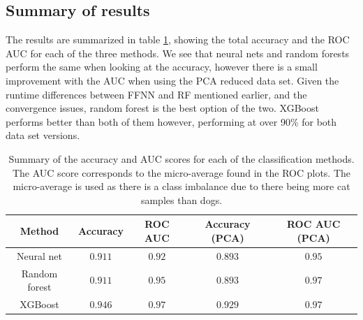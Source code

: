 \documentclass[a4paper]{article}
\begin{document}
\subsection{Summary of results}
The results are summarized in table \ref{tab:summary}, showing the total accuracy and the ROC AUC for each of the three methods. We see that neural nets and random forests perform the same when looking at the accuracy, however there is a small improvement with the AUC when using the PCA reduced data set. Given the runtime differences between FFNN and RF mentioned earlier, and the convergence issues, random forest is the best option of the two. XGBoost performs better than both of them however, performing at over 90\% for both data set versions.
\begin{table}[H]
  \centering
  \caption{Summary of the accuracy and AUC scores for each of the classification methods. The AUC score corresponds to the micro-average found in the ROC plots. The micro-average is used as there is a class imbalance due to there being more cat samples than dogs.}
  \label{tab:summary}
  \begin{tabular}{c|c|c||c|c}
    \hline\hline
    Method & Accuracy & ROC AUC & Accuracy (PCA) & ROC AUC (PCA) \\\hline
    Neural net & $0.911$ & $0.92$ & $0.893$ & $0.95$ \\
    Random forest & $0.911$ & $0.95$ & $0.893$ & $0.97$ \\
    XGBoost & $0.946$ & $0.97$ & $0.929$ & $0.97$
    \end{tabular}
\end{table}

\end{document}
